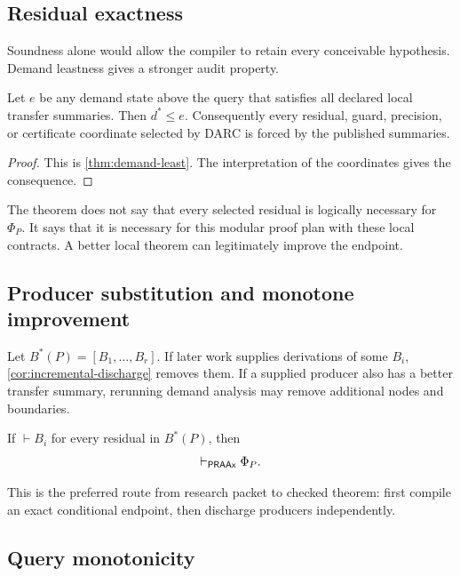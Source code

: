 \subsection{Residual exactness}

Soundness alone would allow the compiler to retain every conceivable
hypothesis.  Demand leastness gives a stronger audit property.

\begin{theorem}
\label{thm:residual-exactness}
Let \(e\) be any demand state above the query that satisfies all declared local
transfer summaries.  Then \(d^*\le e\).  Consequently every residual, guard,
precision, or certificate coordinate selected by DARC is forced by the
published summaries.
\end{theorem}

\begin{proof}
This is \cref{thm:demand-least}.  The interpretation of the coordinates gives
the consequence.
\end{proof}

The theorem does not say that every selected residual is logically necessary
for \(\Phi_P\).  It says that it is necessary for this modular proof plan with
these local contracts.  A better local theorem can legitimately improve the
endpoint.

\subsection{Producer substitution and monotone improvement}

Let \(B^*(P)=[B_1,\ldots,B_r]\).  If later work supplies derivations of some
\(B_i\), \cref{cor:incremental-discharge} removes them.  If a supplied producer
also has a better transfer summary, rerunning demand analysis may remove
additional nodes and boundaries.

\begin{corollary}
If \(\vdash B_i\) for every residual in \(B^*(P)\), then
\[
  \vdash_{\mathsf{PRAAx}}\Phi_P.
\]
\end{corollary}

This is the preferred route from research packet to checked theorem: first
compile an exact conditional endpoint, then discharge producers independently.

\subsection{Query monotonicity}

